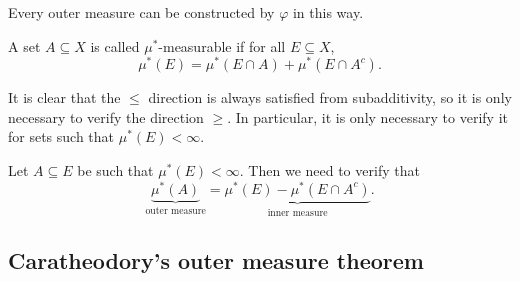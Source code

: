 \documentclass[11pt,a4paper]{article}
\begin{document}
\begin{remark}
  Every outer measure can be constructed by $\varphi$ in this way.
\end{remark}

\begin{definition}
  A set $A \subseteq X$ is called $\mu^*$-measurable if for all $E \subseteq X$,
  \[
    \mu^*(E) = \mu^*(E \cap A) + \mu^*(E \cap A^c).
  \]
\end{definition}

\begin{remark}
  It is clear that the $\le$ direction is always satisfied from subadditivity,
  so it is only necessary to verify the direction $\geq$.
  In particular, it is only necessary to verify it for sets such that
  $\mu^*(E) < \infty$.
\end{remark}

Let $A \subseteq E$ be such that $\mu^*(E) < \infty$.
Then we need to verify that
\[
  \underbrace{\mu^*(A)}_{\text{outer measure}} = 
  \underbrace{\mu^*(E) - \mu^*(E \cap A^c)}_{\text{inner measure}}.
\]

\subsection{Caratheodory's outer measure theorem}
\end{document}
